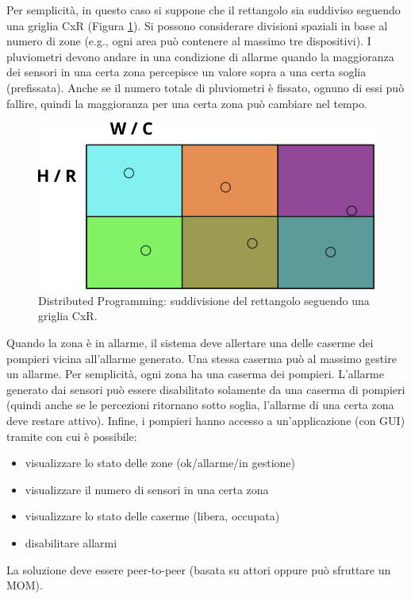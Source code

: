 \documentclass[12pt,a4paper,openright,twoside]{book}
\begin{document}
Per semplicità, in questo caso si suppone che il rettangolo sia suddiviso seguendo una griglia CxR (Figura \ref{fig:dpg}). Si possono considerare divisioni spaziali in base al numero di zone (e.g., ogni area può contenere al massimo tre dispositivi).
I pluviometri devono andare in una condizione di allarme quando la maggioranza dei sensori in una certa zona percepisce un valore sopra a una certa soglia (prefissata).
Anche se il numero totale di pluviometri è fissato, ognuno di essi può fallire, quindi la maggioranza per una certa zona può cambiare nel tempo.
\begin{figure}[H]
	\centering
	\includegraphics[width=\textwidth]{figures/distributed-programming-grid.png}
	\caption{Distributed Programming: suddivisione del rettangolo seguendo una griglia CxR.}
	\label{fig:dpg}
\end{figure}
Quando la zona è in allarme, il sistema deve allertare una delle caserme dei pompieri vicina all’allarme generato. Una stessa caserma può al massimo gestire un allarme. Per semplicità, ogni zona ha una caserma dei pompieri.
L’allarme generato dai sensori può essere disabilitato solamente da una caserma di pompieri (quindi anche se le percezioni ritornano sotto soglia, l’allarme di una certa zona deve restare attivo).
Infine, i pompieri hanno accesso a un'applicazione (con GUI) tramite con cui è possibile:
\begin{itemize}
    \item visualizzare lo stato delle zone (ok/allarme/in gestione)
    \item visualizzare il numero di sensori in una certa zona
    \item visualizzare lo stato delle caserme (libera, occupata)
    \item disabilitare allarmi
\end{itemize}
La soluzione deve essere peer-to-peer (basata su attori oppure può sfruttare un MOM).
\end{document}
